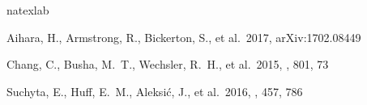 \documentclass{pasj01}
\begin{document}
\begin{ack}
\end{ack}


%


\begin{thebibliography}{}
\expandafter\ifx\csname natexlab\endcsname\relax\def\natexlab#1{#1}\fi

 Aihara, H., Armstrong, R., Bickerton, S., et al.\ 
         2017, arXiv:1702.08449 

 Chang, C., Busha, M.~T., Wechsler, R.~H., et al.\ 
         2015, \apj, 801, 73 

 Suchyta, E., Huff, E.~M., Aleksi{\'c}, J., 
         et al.\ 2016, \mnras, 457, 786 

\end{thebibliography}




%

\label{lastpage}
\end{document}
